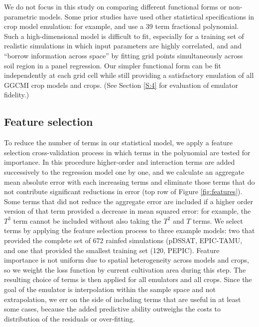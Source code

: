 \documentclass[gmd, manuscript]{copernicus} %
\begin{document}
We do not focus in this study on comparing different functional forms or non-parametric models.
Some prior studies have used other statistical specifications in crop model emulation: for example, \citet{BLANC2015} and \citet{BLANC2017} use a 39 term fractional polynomial. 
Such a high-dimensional model is difficult to fit, especially for a training set of realistic simulations in which input parameters are highly correlated, and  \citet{BLANC2015} and \citet{BLANC2017}  ``borrow information across space'' by fitting grid points simultaneously across soil region in a panel regression. 
Our simpler functional form can be fit independently at each grid cell while still providing a satisfactory emulation of all GGCMI crop models and crops. 
(See Section \ref{S:4} for evaluation of emulator fidelity.)

\subsection{Feature selection}
To reduce the number of terms in our statistical model, we apply a feature selection cross-validation process in which terms in the polynomial are tested for importance.
In this procedure higher-order and interaction terms are added successively to the regression model one by one, and 
we calculate an aggregate mean absolute error with each increasing terms and eliminate those terms that do not contribute significant reductions in error (top row of Figure \ref{fig:features}). 
Some terms that did not reduce the aggregate error are included if a higher order version of that term provided a decrease in mean squared error: for example, the $T^3$ term cannot be included without also taking the $T^2$ and $T$ terms. 
We select terms by applying the feature selection process to three example models: two that provided the complete set of 672 rainfed simulations (pDSSAT, EPIC-TAMU, and one that provided the smallest training set (120, PEPIC). 
Feature importance is not uniform due to spatial heterogeneity across models and crops, so we weight the loss function by current cultivation area \citep{Portmann2010} during this step. 
The resulting choice of terms is then applied for all emulators and all crops. 
Since the goal of the emulator is interpolation within the sample space and not extrapolation, we err on the side of including terms that are useful in at least some cases, because the added predictive ability outweighs the costs to distribution of the residuals or over-fitting.  
\end{document}
